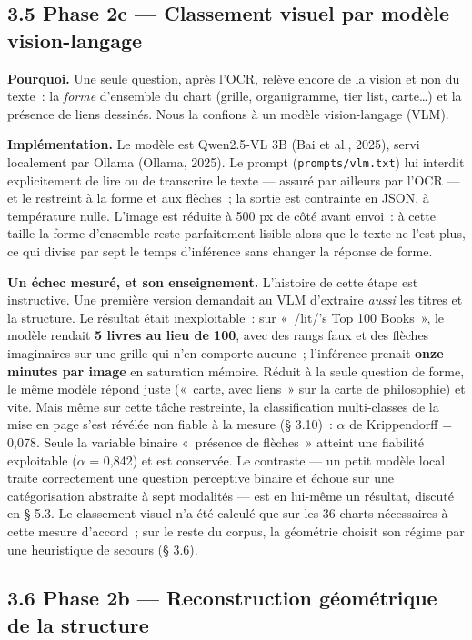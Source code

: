 \documentclass[11pt,a4paper]{article}
\begin{document}
\subsection*{3.5 Phase 2c --- Classement visuel par modèle vision-langage}

\textbf{Pourquoi.} Une seule question, après l'OCR, relève encore de la vision et non du texte~: la \emph{forme} d'ensemble du chart (grille, organigramme, tier list, carte…) et la présence de liens dessinés. Nous la confions à un modèle vision-langage (VLM).

\textbf{Implémentation.} Le modèle est Qwen2.5-VL 3B (Bai et al., 2025), servi localement par Ollama (Ollama, 2025). Le prompt (\texttt{prompts/vlm.txt}) lui interdit explicitement de lire ou de transcrire le texte --- assuré par ailleurs par l'OCR --- et le restreint à la forme et aux flèches~; la sortie est contrainte en JSON, à température nulle. L'image est réduite à 500 px de côté avant envoi~: à cette taille la forme d'ensemble reste parfaitement lisible alors que le texte ne l'est plus, ce qui divise par sept le temps d'inférence sans changer la réponse de forme.

\textbf{Un échec mesuré, et son enseignement.} L'histoire de cette étape est instructive. Une première version demandait au VLM d'extraire \emph{aussi} les titres et la structure. Le résultat était inexploitable~: sur «~/lit/'s Top 100 Books~», le modèle rendait \textbf{5 livres au lieu de 100}, avec des rangs faux et des flèches imaginaires sur une grille qui n'en comporte aucune~; l'inférence prenait \textbf{onze minutes par image} en saturation mémoire. Réduit à la seule question de forme, le même modèle répond juste («~carte, avec liens~» sur la carte de philosophie) et vite. Mais même sur cette tâche restreinte, la classification multi-classes de la mise en page s'est révélée non fiable à la mesure (§ 3.10)~: $\alpha$ de Krippendorff = 0,078. Seule la variable binaire «~présence de flèches~» atteint une fiabilité exploitable ($\alpha$ = 0,842) et est conservée. Le contraste --- un petit modèle local traite correctement une question perceptive binaire et échoue sur une catégorisation abstraite à sept modalités --- est en lui-même un résultat, discuté en § 5.3. Le classement visuel n'a été calculé que sur les 36 charts nécessaires à cette mesure d'accord~; sur le reste du corpus, la géométrie choisit son régime par une heuristique de secours (§ 3.6).

\subsection*{3.6 Phase 2b --- Reconstruction géométrique de la structure}
\end{document}
